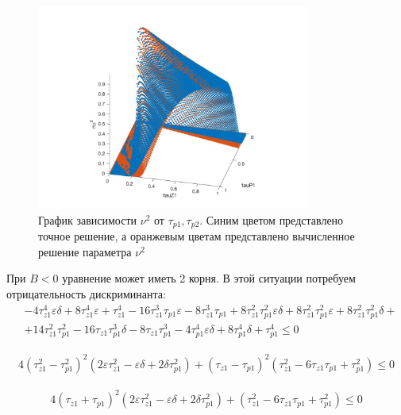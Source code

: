 \documentclass[a4paper,14pt]{extarticle} %
\begin{document}
  \begin{figure}[H]
\includegraphics[width=9cm]{images/main.jpg}
\caption{График зависимости $\nu^2$ от $\tau_{p1}, \tau_{p2}$.  Синим цветом представлено точное решение, а оранжевым цветам представлено вычисленное решение параметра $\nu^2$}
\end{figure}

При $B < 0$ уравнение может иметь 2 корня. В этой ситуации потребуем отрицательность дискриминанта:
 \begin{equation}
 \begin{aligned}
&-4\tau_{z1}^4 \varepsilon \delta + 8\tau_{z1}^4 \varepsilon + \tau_{z1}^4 - 16\tau_{z1}^3 \tau_{p1} \varepsilon - 8\tau_{z1}^3 \tau_{p1} + 8\tau_{z1}^2 \tau_{p1}^2 \varepsilon \delta + 8\tau_{z1}^2 \tau_{p1}^2 \varepsilon + 8\tau_{z1}^2 \tau_{p1}^2 \delta + \\
& + 14\tau_{z1}^2 \tau_{p1}^2 - 16\tau_{z1} \tau_{p1}^3 \delta - 8\tau_{z1} \tau_{p1}^3 - 4\tau_{p1}^4 \varepsilon \delta + 8\tau_{p1}^4 \delta + \tau_{p1}^4 \leq 0
 \end{aligned}
\end{equation}

 \begin{equation}
 \begin{aligned}
4(\tau_{z1}^2-\tau_{p1}^2)^2(2\varepsilon\tau_{z1}^2-\varepsilon\delta+2\delta\tau_{p1}^2)+(\tau_{z1}-\tau_{p1})^2(\tau_{z1}^2-6\tau_{z1}\tau_{p1}+\tau_{p1}^2)\leq 0
 \end{aligned}
\end{equation}

 \begin{equation}
 \begin{aligned}
4(\tau_{z1}+\tau_{p1})^2(2\varepsilon\tau_{z1}^2-\varepsilon\delta+2\delta\tau_{p1}^2)+(\tau_{z1}^2-6\tau_{z1}\tau_{p1}+\tau_{p1}^2)\leq 0
 \end{aligned}
\end{equation}
\end{document}
